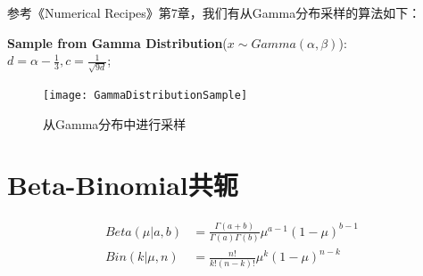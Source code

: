参考《Numerical Recipes》第7章，我们有从Gamma分布采样的算法如下：

\begin{minipage}{0.8\textwidth}\centering
\begin{algorithm}[H]
\textbf{Sample from Gamma Distribution}($x \sim Gamma(\alpha, \beta)$):\\
$d=\alpha - \frac{1}{3}, c=\frac{1}{\sqrt{9d}}$;\\
\end{algorithm}
\end{minipage}

\begin{figure}[htbp]
\centering
\texttt{[image: GammaDistributionSample]}
\caption{从Gamma分布中进行采样}
\end{figure}

\section{Beta-Binomial共轭}

\begin{displaymath}
\begin{split}
Beta(\mu|a,b) &= \frac{\Gamma(a+b)}{\Gamma(a)\Gamma(b)} \mu^{a-1} (1-\mu)^{b-1}\\
Bin(k|\mu, n)  &= \frac{n!}{k!(n-k)!} \mu^k(1-\mu)^{n-k}\\
\end{split}
\end{displaymath}

